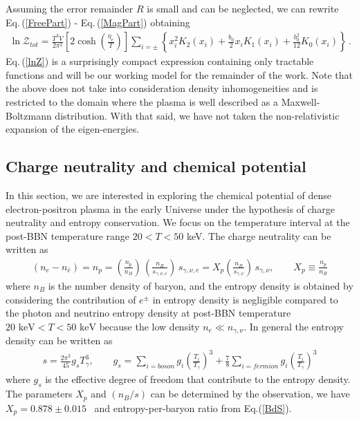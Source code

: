 \documentclass[universe,article,submit,moreauthors,pdftex,a4paper]{Definitions/mdpi}
\newcommand{\keV}{\text{ keV}}
\newcommand{\req}[1]{Eq.\,(\ref{#1})}
\begin{document}
Assuming the error remainder $R$ is small and can be neglected, we can rewrite \req{FreePart} - \req{MagPart} obtaining
\begin{align}
 \label{lnZ}
 \ln\mathcal{Z}_{tot}=\frac{T^3V}{2\pi^2}\left[2\cosh\left(\frac{\eta_{e}}{T}\right)\right]\sum_{i=\pm}\left\{x_i^{2} K_2\left(x_i\right)+\frac{b_0}{2}x_iK_1\left(x_i\right)+\frac{b^2_0}{12}K_0\left(x_i\right)\right\}\,.
\end{align}
\req{lnZ} is a surprisingly compact expression containing only tractable functions and will be our working model for the remainder of the work. Note that the above does not take into consideration density inhomogeneities and is restricted to the domain where the plasma is well described as a Maxwell-Boltzmann distribution. With that said, we have not taken the non-relativistic expansion of the eigen-energies.

\subsection{Charge neutrality and chemical potential}
\noindent In this section, we are interested in exploring the chemical potential of dense electron-positron plasma in the early Universe under the hypothesis of charge neutrality and entropy conservation. We focus on the temperature interval at the post-BBN temperature range $20<T<50$ keV. The charge neutrality can be written as
\begin{align}
 \label{density_proton}
 \left(n_{e}-n_{\bar{e}}\right)=n_{p}=\left(\frac{n_{p}}{n_{B}}\right)\,\left(\frac{n_{B}}{s_{\gamma,\nu,e}}\right)\,s_{\gamma,\nu,e}= X_p\left(\frac{n_B}{s_{\gamma,\nu}}\right)\,s_{\gamma,\nu},\qquad X_p\equiv\frac{n_p}{n_B}
\end{align}
where $n_B$ is the number density of baryon, and the entropy density is obtained by considering the contribution of $e^\pm$ in entropy density is negligible compared to the photon and neutrino entropy density at post-BBN temperature $20\keV<T<50\keV$ because the low density $n_e\ll n_{\gamma,\nu}$. In general the entropy density can be written as~\cite{kolb1990early}
\begin{align}
s=\frac{2\pi^2}{45}g_sT_\gamma^3,\qquad g_s=\sum_{i=boson}g_i\left(\frac{T_i}{T_\gamma}\right)^3+\frac{7}{8}\sum_{i=fermion}g_i\left(\frac{T_i}{T_\gamma}\right)^3
\end{align}
where $g_s$ is the effective degree of freedom that contribute to the entropy density. The parameters $X_p$ and $(n_B/s)$ can be determined by the observation, we have $X_p=0.878\pm0.015$~\cite{ParticleDataGroup:2022pth} and entropy-per-baryon ratio from Eq.(\ref{BdS}). 
\end{document}
